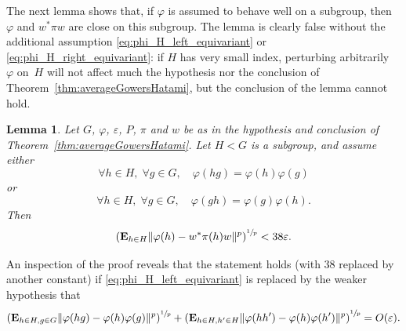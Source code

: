 \documentclass[JEP,XML,SOM,Unicode,published]{cedram}
\theoremstyle{plain}
\newtheorem{lemma}[theorem]{Lemma}
\theoremstyle{definition}
\newcommand{\E}{\mathbf{E}}
\begin{document}
The next lemma shows that, if $\varphi$ is assumed to behave well on a subgroup, then~$\varphi$ and $w^* \pi w$ are close on this subgroup. The lemma is clearly false without the additional assumption \eqref{eq:phi_H_left_equivariant} or \eqref{eq:phi_H_right_equivariant}: if $H$ has very small index, perturbing arbitrarily~$\varphi$ on~$H$ will not affect much the hypothesis nor the conclusion of Theorem~\ref{thm:averageGowersHatami}, but the conclusion of the lemma cannot hold.
\begin{lemma}\label{lem:GowersHatami_subgroup} Let $G$, $\varphi$, $\varepsilon$, $P$, $\pi$ and $w$ be as in the hypothesis and conclusion of Theorem~\ref{thm:averageGowersHatami}. Let $H<G$ is a subgroup, and assume either\vspace*{-3pt}
\begin{equation}\label{eq:phi_H_left_equivariant}
\forall h\in H,\; \forall g\in G,\quad \varphi(hg) = \varphi(h) \varphi(g)
\end{equation}
or\vspace*{-3pt}
\begin{equation}\label{eq:phi_H_right_equivariant}
\forall h\in H,\; \forall g\in G,\quad \varphi(gh) = \varphi(g) \varphi(h).
\end{equation}
Then\vspace*{-3pt}
\[
\left(\E_{h \in H} \|\varphi(h)-w^* \pi(h) w\|^p\right)^{\sfrac 1 p}< 38 \varepsilon.
\]
\end{lemma}
An inspection of the proof reveals that the statement holds (with $38$ replaced by another constant) if \eqref{eq:phi_H_left_equivariant} is replaced by the weaker hypothesis that\vspace*{-3pt}
\[
\left(\E_{h\in H,g \in G} \|\varphi(hg) - \varphi(h) \varphi(g)\|^p\right)^{\sfrac 1 p} + \left(\E_{h \in H, h'\in H} \|\varphi(hh') - \varphi(h) \varphi(h')\|^p\right)^{\sfrac 1 p} = O(\varepsilon).
\]
\end{document}
